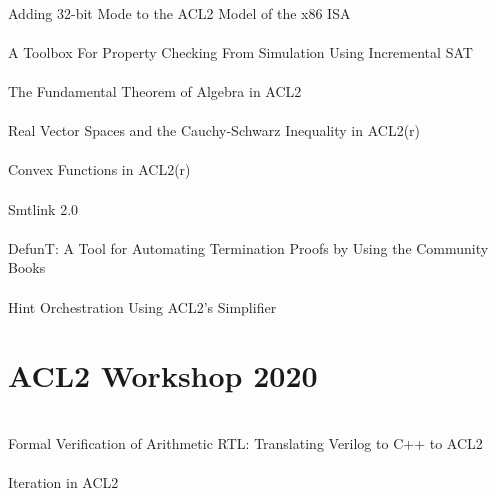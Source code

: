 \documentclass{article}
\begin{document}
\cite{18-coglio-x86} \\
Adding 32-bit Mode to the {ACL2} Model of the x86 {ISA} \\

\cite{18-sumners-toolbox} \\
A Toolbox For Property Checking From Simulation Using
Incremental {SAT} \\

\cite{18-gamboa-algebra} \\
The Fundamental Theorem of Algebra in {ACL2} \\

\cite{18-kwan-cauchy-schwarz} \\
Real Vector Spaces and the Cauchy-Schwarz Inequality in {ACL2}(r) \\

\cite{18-kwan-convex} \\
Convex Functions in {ACL2}(r) \\

\cite{18-peng-algebra} \\
{Smtlink} 2.0 \\

\cite{18-kaufmann-defunt} \\
{DefunT}: A Tool for Automating Termination Proofs by Using the Community Books \\

\cite{18-swords-orchestration} \\
Hint Orchestration Using {ACL2}'s Simplifier \\

\section{ACL2 Workshop 2020}

\cite{20-russinoff-rtl} \\
Formal Verification of Arithmetic {RTL:} Translating Verilog to {C++} to {ACL2} \\

\cite{20-kaufmann-iteration} \\
Iteration in {ACL2} \\
\end{document}
